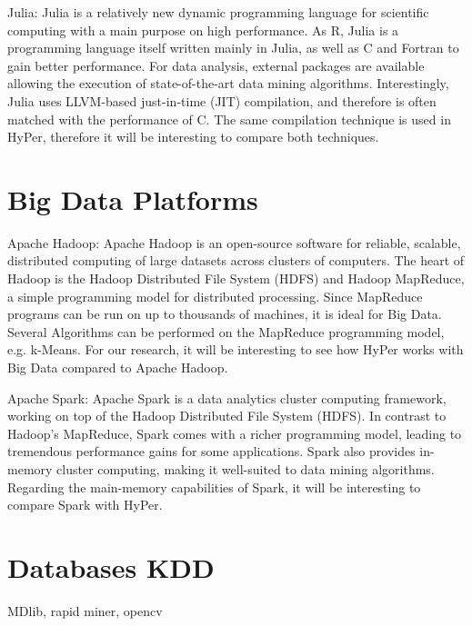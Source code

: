 Julia: Julia is a relatively new dynamic programming language for scientific computing with a main purpose on high performance. As R, Julia is a programming language itself written mainly in Julia, as well as C and Fortran to gain better performance. For data analysis, external packages are available allowing the execution of state-of-the-art data mining algorithms. Interestingly, Julia uses LLVM-based just-in-time (JIT) compilation, and therefore is often matched with the performance of C. The same compilation technique is used in HyPer, therefore it will be interesting to compare both techniques.


\section{Big Data Platforms}

Apache Hadoop: Apache Hadoop is an open-source software for reliable, scalable, distributed computing of large datasets across clusters of computers. The heart of Hadoop is the Hadoop Distributed File System (HDFS) and Hadoop MapReduce, a simple programming model for distributed processing. Since MapReduce programs can be run on up to thousands of machines, it is ideal for Big Data. Several Algorithms can be performed on the MapReduce programming model, e.g. k-Means. For our research, it will be interesting to see how HyPer works with Big Data compared to Apache Hadoop.

Apache Spark: Apache Spark is a data analytics cluster computing framework, working on top of the Hadoop Distributed File System (HDFS). In contrast to Hadoop’s MapReduce, Spark comes with a richer programming model, leading to tremendous performance gains for some applications. Spark also provides in-memory cluster computing, making it well-suited to data mining algorithms. Regarding the main-memory capabilities of Spark, it will be interesting to compare Spark with HyPer.

\section{Databases KDD}
MDlib, rapid miner, opencv
